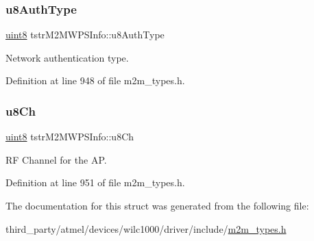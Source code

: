 \subsubsection{\texorpdfstring{u8\+Auth\+Type}{u8AuthType}}
{\footnotesize\ttfamily \hyperlink{group__DataT_ga4df709a77647e870bbf1d955b8edc9a6}{uint8} tstr\+M2\+M\+W\+P\+S\+Info\+::u8\+Auth\+Type}

Network authentication type. 

Definition at line 948 of file m2m\+\_\+types.\+h.

\mbox{\label{structtstrM2MWPSInfo_a693e6204dbbe233cbf7aaa26e33d9f5c}} 
\subsubsection{\texorpdfstring{u8\+Ch}{u8Ch}}
{\footnotesize\ttfamily \hyperlink{group__DataT_ga4df709a77647e870bbf1d955b8edc9a6}{uint8} tstr\+M2\+M\+W\+P\+S\+Info\+::u8\+Ch}

RF Channel for the AP. 

Definition at line 951 of file m2m\+\_\+types.\+h.



The documentation for this struct was generated from the following file\+:\begin{DoxyCompactItemize}
\item 
third\+\_\+party/atmel/devices/wilc1000/driver/include/\hyperlink{m2m__types_8h}{m2m\+\_\+types.\+h}\end{DoxyCompactItemize}
